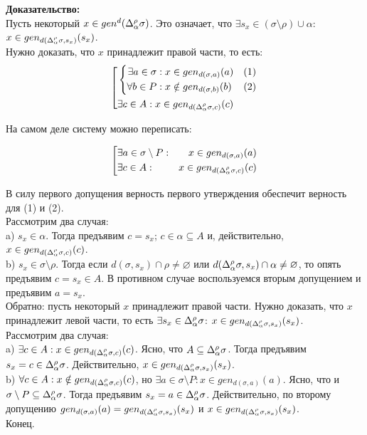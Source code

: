 \textbf{Доказательство:}\\
Пусть некоторый $x \in gen^d(\Delta_\alpha^\rho\sigma)$. Это означает, что $\exists s_x \in (\sigma \setminus \rho) \cup \alpha$: $x \in gen_{d(\Delta_\alpha^\rho\sigma, s_x)} (s_x)$.\\
Нужно доказать, что $x$ принадлежит правой части, то есть:
$$
\left[
\begin{aligned}
	&\left\{
	\begin{aligned}
		\exists a \in \sigma&: x \in gen_{d(\sigma, a)} (a) &(1)\\
		\forall b \in P&: x \notin gen_{d(\sigma, b)} (b) &(2)\\
	\end{aligned}
	\right.\\
	&\exists c \in A: x \in gen_{d(\Delta_\alpha^\rho\sigma, c)} (c)\\
\end{aligned}
\right.
$$

На самом деле систему можно переписать:

$$
\left[
\begin{aligned}
	&\exists a \in \sigma \setminus P: &x \in gen_{d(\sigma, a)} (a)\\
	&\exists c \in A: &x \in gen_{d(\Delta_\alpha^\rho\sigma, c)} (c)\\
\end{aligned}
\right.
$$

В силу первого допущения верность первого утверждения обеспечит верность для (1) и (2).\\
Рассмотрим два случая:\\
\indent a) $s_x \in \alpha$. Тогда предъявим $c = s_x$; $c \in \alpha \subseteq A$ и, действительно, $x \in gen_{d(\Delta_\alpha^\rho\sigma, c)} (c)$.\\
\indent b) $s_x \in \sigma \setminus \rho$. Тогда если $d(\sigma, s_x) \cap \rho \neq \varnothing$ или $d(\Delta_\alpha^\rho\sigma, s_x) \cap \alpha \neq \varnothing$, то опять предъявим $c = s_x \in A$. В противном случае воспользуемся вторым допущением и предъявим $a = s_x$.\\

Обратно: пусть некоторый $x$ принадлежит правой части. Нужно доказать, что $x$ принадлежит левой части, то есть $\exists s_x \in \Delta_\alpha^\rho\sigma$: $x \in gen_{d(\Delta_\alpha^\rho\sigma, s_x)} (s_x)$.\\
Рассмотрим два случая:\\
\indent a) $\exists c \in A: x \in gen_{d(\Delta_\alpha^\rho\sigma, c)} (c)$. Ясно, что $A \subseteq \Delta_\alpha^\rho\sigma$. Тогда предъявим $s_x = c \in \Delta_\alpha^\rho\sigma$. Действительно, $x \in gen_{d(\Delta_\alpha^\rho\sigma, s_x)} (s_x)$.\\
\indent b) $\forall c \in A: x \notin gen_{d(\Delta_\alpha^\rho\sigma, c)} (c)$, но $\exists a \in \sigma \setminus P: x \in gen_{d(\sigma, a)} (a)$. Ясно, что и $\sigma \setminus P \subseteq \Delta_\alpha^\rho\sigma$. Тогда предъявим $s_x = a \in \Delta_\alpha^\rho\sigma$. Действительно, по второму допущению $gen_{d(\sigma, a)} (a) = gen_{d(\Delta_\alpha^\rho\sigma, s_x)} (s_x)$ и $x \in gen_{d(\Delta_\alpha^\rho\sigma, s_x)} (s_x)$.\\

Конец.

